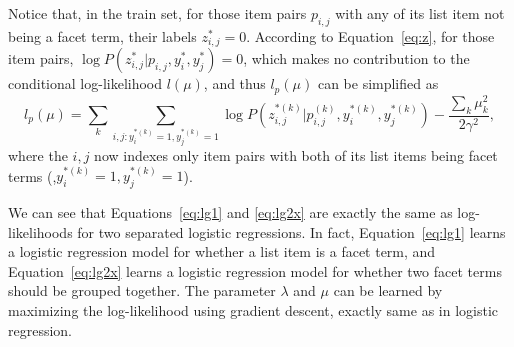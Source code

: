 Notice that, in the train set, for those item pairs $p_{i,j}$ with any of its list item not being a facet term, their labels $z_{i,j}^{*}=0$. According to Equation~\ref{eq:z}, for those item pairs, $\log P(z_{i,j}^{*}|p_{i,j},y_i^{*},y_j^{*})=0$, which makes no contribution to the conditional log-likelihood $l(\mu)$, and thus $l_p(\mu)$ can be simplified as
\begin{equation}
\label{eq:lg2x}
l_p(\mu) = \sum_{k}{\sum_{i,j: y_i^{*(k)}=1, y_j^{*(k)}=1}}{\log P(z_{i,j}^{*(k)}|p_{i,j}^{(k)},y_i^{*(k)},y_j^{*(k)})} -  \frac{\sum_{k}{\mu_k^2}}{2 \gamma^2},
\end{equation}
where the $i,j$ now indexes only item pairs with both of its list items being facet terms (\ie,$y_i^{*(k)}=1, y_j^{*(k)}=1$).

We can see that Equations~\ref{eq:lg1} and \ref{eq:lg2x} are exactly the same as log-likelihoods for two separated logistic regressions. In fact, Equation~\ref{eq:lg1} learns a logistic regression model for whether a list item is a facet term, and Equation~\ref{eq:lg2x} learns a logistic regression model for whether two facet terms should be grouped together.
The parameter $\lambda$ and $\mu$ can be learned by maximizing the log-likelihood using gradient descent, exactly same as in logistic regression.

